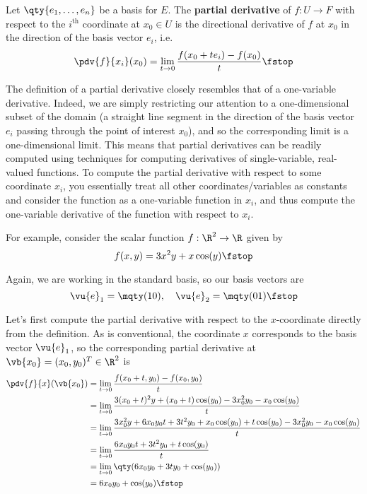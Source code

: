 \begin{definition}
  Let \( \qty{e_1,\dots, e_n} \) be a basis for \( E \). The \textbf{partial derivative} of \( f:U\to F \) with respect to the \( i^{\text{th}} \) coordinate at \( x_0\in U \) is the directional derivative of \( f \) at \( x_0 \) in the direction of the basis vector \( e_i \), i.e.\
  \[ {\pdv{f}{x_i}} (x_0)=\lim_{t\to 0}\frac{f(x_0+te_i)-f(x_0)}{t}\fstop \]
\end{definition}

The definition of a partial derivative closely resembles that of a one-variable derivative. Indeed, we are simply restricting our attention to a one-dimensional subset of the domain (a straight line segment in the direction of the basis vector \( e_i \) passing through the point of interest \( x_0 \)), and so the corresponding limit is a one-dimensional limit. This means that partial derivatives can be readily computed using techniques for computing derivatives of single-variable, real-valued functions. To compute the partial derivative with respect to some coordinate \( x_i \), you essentially treat all other coordinates/variables as constants and consider the function as a one-variable function in \( x_i \), and thus compute the one-variable derivative of the function with respect to \( x_i \).

\vspace{3mm}

For example, consider the scalar function \( f:\R^2\to\R \) given by
\[ f(x,y)=3x^2y+x\cos(y)\fstop \]

Again, we are working in the standard basis, so our basis vectors are
\[ \vu{e}_1=\mqty(1\\0), \quad \vu{e}_2=\mqty(0\\1)\fstop \]

Let's first compute the partial derivative with respect to the \( x \)-coordinate directly from the definition. As is conventional, the coordinate \( x \) corresponds to the basis vector \( \vu{e}_1 \), so the corresponding partial derivative at \( \vb{x_0}=(x_0,y_0)^T\in\R^2 \) is
\begin{align*}
  {\pdv{f}{x}}(\vb{x_0})&= \lim_{t\to 0}\frac{f(x_0+t,y_0)-f(x_0,y_0)}{t}\\
  &= \lim_{t\to 0}\frac{3(x_0+t)^2y+(x_0+t)\cos(y_0)-3x_0^2y_0-x_0\cos(y_0)}{t}\\
  &= \lim_{t\to 0}\frac{3x_0^2y+6x_0y_0t+3t^2y_0+x_0\cos(y_0)+t\cos(y_0)-3x_0^2y_0-x_0\cos(y_0)}{t}\\
  &= \lim_{t\to 0}\frac{6x_0y_0t+3t^2y_0+t\cos(y_0)}{t}\\
  &= \lim_{t\to 0}\qty(6x_0y_0+3ty_0+\cos(y_0))\\
  &= 6x_0y_0+\cos(y_0)\fstop
\end{align*}


